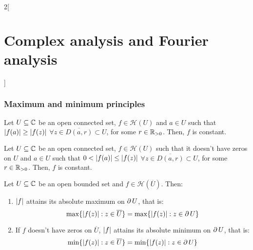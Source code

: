 \documentclass[../../../main.tex]{subfiles}
\begin{document}
\begin{multicols}{2}[\section{Complex analysis and Fourier analysis}]
  \subsubsection{Maximum and minimum principles}
  \begin{theorem}
    Let $U\subseteq\mathbb{C}$ be an open connected set, $f\in\mathcal{H}(U)$ and $a\in U$ such that $\abs{f(a)}\geq \abs{f(z)}$ $\forall z\in \overline{D(a,r)}\subset U$, for some $r\in\mathbb{R}_{>0}$. Then, $f$ is constant.
  \end{theorem}
  \begin{corollary}
    Let $U\subseteq\mathbb{C}$ be an open connected set, $f\in\mathcal{H}(U)$ such that it doesn't have zeros on $U$ and $a\in U$ such that $0<\abs{f(a)}\leq \abs{f(z)}$ $\forall z\in \overline{D(a,r)}\subset U$, for some $r\in\mathbb{R}_{>0}$. Then, $f$ is constant.
  \end{corollary}
  \begin{corollary}
    Let $U\subseteq\mathbb{C}$ be an open bounded set and $f\in\mathcal{H}(\overline{U})$. Then:
    \begin{enumerate}
      \item $\abs{f}$ attains its absolute maximum on $\operatorname{\partial}{U}$, that is: $$\max\{\abs{f(z)}:z\in\overline{U}\}=\max\{\abs{f(z)}:z\in\operatorname{\partial} U\}$$
      \item If $f$ doesn't have zeros on $\overline{U}$, $\abs{f}$ attains its absolute minimum on $\operatorname{\partial}{U}$, that is: $$\min\{\abs{f(z)}:z\in\overline{U}\}=\min\{\abs{f(z)}:z\in\operatorname{\partial} U\}$$
    \end{enumerate}
  \end{corollary}

\end{multicols}
\end{document}
